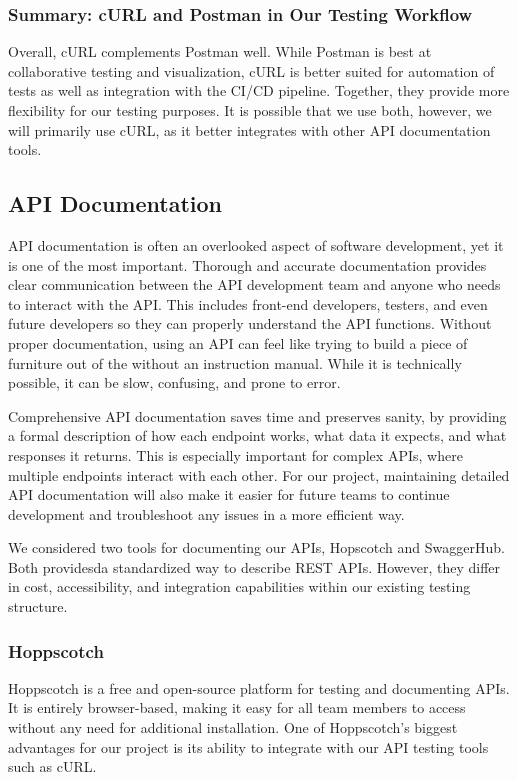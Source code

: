 \documentclass[12pt]{article}
\begin{document}
\subsubsection{Summary: cURL and Postman in Our Testing Workflow}
Overall, cURL complements Postman well. While Postman is best at collaborative testing and visualization, cURL is better suited for automation of tests as well as integration with the CI/CD pipeline. Together, they provide more flexibility for our testing purposes. It is possible that we use both, however, we will primarily use cURL, as it better integrates with other API documentation tools.

\subsection{API Documentation}
API documentation is often an overlooked aspect of software development, yet it is one of the most important. Thorough and accurate documentation provides clear communication between the API development team and anyone who needs to interact with the API. This includes front-end developers, testers, and even future developers so they can properly understand the API functions. Without proper documentation, using an API can feel like trying to build a piece of furniture out of the without an instruction manual. While it is technically possible, it can be slow, confusing, and prone to error.

Comprehensive API documentation saves time and preserves sanity, by providing a formal description of how each endpoint works, what data it expects, and what responses it returns. This is especially important for complex APIs, where multiple endpoints interact with each other. For our project, maintaining detailed API documentation will also make it easier for future teams to continue development and troubleshoot any issues in a more efficient way.

We considered two tools for documenting our APIs, Hopscotch and SwaggerHub. Both providesda standardized way to describe REST APIs. However, they differ in cost, accessibility, and integration capabilities within our existing testing structure.
\subsubsection{Hoppscotch}
Hoppscotch is a free and open-source platform for testing and documenting APIs. It is entirely browser-based, making it easy for all team members to access without any need for additional installation. One of Hoppscotch’s biggest advantages for our project is its ability to integrate with our API testing tools such as cURL.
\end{document}

